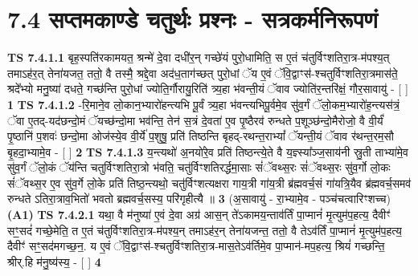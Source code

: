 \documentclass[17pt]{extarticle}
\begin{document}
     \section*{ 7.4      सप्तमकाण्डे चतुर्थः प्रश्नः - सत्रकर्मनिरूपणं }
                                        \textbf{ TS 7.4.1.1} \newline
                  बृह॒स्पति॑रकामयत॒ श्रन्मे॑ दे॒वा दधी॑र॒न् गच्छे॑यं पुरो॒धामिति॒ स ए॒तं च॑तुर्विꣳशतिरा॒त्र-म॑पश्य॒त् तमाऽह॑र॒त् तेना॑यजत॒ ततो॒ वै तस्मै॒ श्रद्दे॒वा अद॑ध॒ताग॑च्छत् पुरो॒धां ॅय ए॒वं ॅवि॒द्वाꣳस॑-श्चतुर्विꣳशतिरा॒त्रमास॑ते॒ श्रदे᳚भ्यो मनु॒ष्या॑ दधते॒ गच्छ॑न्ति पुरो॒धां ज्योति॒र्गौरायु॒रिति॑ त्र्य॒हा भ॑वन्ती॒यं ॅवाव ज्योति॑र॒न्तरि॑क्षं॒ गौर॒सावायु॑ - [  ] \textbf{  1} \newline
                  \newline
                                \textbf{ TS 7.4.1.2} \newline
                  -रि॒माने॒व लो॒कान॒भ्यारो॑हन्त्यभि पू॒र्वं त्र्य॒हा भ॑वन्त्यभिपू॒र्वमे॒व सु॑व॒र्गं ॅलो॒कम॒भ्यारो॑ह॒न्त्यस॑त्रं॒ ॅवा ए॒तद्-यद॑छन्दो॒मं ॅयच्छ॑न्दो॒मा भव॑न्ति॒ तेन॑ स॒त्रं दे॒वता॑ ए॒व पृ॒ष्ठैरव॑ रुन्धते प॒शूञ्छ॑न्दो॒मैरोजो॒ वै वी॒र्यं॑ पृ॒ष्ठानि॑ प॒शवः॑ छन्दो॒मा ओज॑स्ये॒व वी॒र्ये॑ प॒शुषु॒ प्रति॑ तिष्ठन्ति बृहद्-रथन्त॒राभ्यां᳚ ॅयन्ती॒यं ॅवाव र॑थन्त॒रम॒सौ बृ॒हदा॒भ्यामे॒व - [  ] \textbf{  2} \newline
                  \newline
                                \textbf{ TS 7.4.1.3} \newline
                  य॒न्त्यथो॑ अ॒नयो॑रे॒व प्रति॑ तिष्ठन्त्ये॒ते वै य॒ज्ञ्स्या᳚ञ्ज॒साय॑नी स्रु॒ती ताभ्या॑मे॒व सु॑व॒र्गं ॅलो॒कं ॅय॑न्ति चतुर्विꣳशतिरा॒त्रो भ॑वति॒ चतु॑र्विꣳशतिरर्द्धमा॒साः सं॑ॅवथ्स॒रः सं॑ॅवथ्स॒रः सु॑व॒र्गो लो॒कः सं॑ॅवथ्स॒र ए॒व सु॑व॒र्गे लो॒के प्रति॑ तिष्ठ॒न्त्यथो॒ चतु॑र्विꣳशत्यक्षरा गाय॒त्री गा॑य॒त्री ब्र॑ह्मवर्च॒सं गा॑यत्रि॒यैव ब्र॑ह्मवर्च॒समव॑ रुन्धते ऽतिरा॒त्राव॒भितो॑ भवतो ब्रह्मवर्च॒सस्य॒ परि॑गृहीत्यै ॥ \textbf{  3} \newline
                  \newline
                      (अ॒सावायु॑ - रा॒भ्यामे॒व - पञ्च॑चत्वारिꣳशच्च)  \textbf{(A1)} \newline \newline
                                        \textbf{ TS 7.4.2.1} \newline
                  यथा॒ वै म॑नुष्या॑ ए॒वं दे॒वा अग्र॑ आस॒न् ते॑ऽकामय॒न्ताव॑र्तिं पा॒प्मानं॑ मृ॒त्युम॑प॒हत्य॒ दैवीꣳ॑ सꣳ॒॒सदं॑ गच्छे॒मेति॒ त ए॒तं च॑तुर्विꣳशतिरा॒त्र-म॑पश्य॒न् तमाऽह॑र॒न् तेना॑यजन्त॒ ततो॒ वै तेऽव॑र्तिं पा॒प्मानं॑ मृ॒त्युम॑प॒हत्य॒ दैवीꣳ॑ सꣳ॒॒सद॑मगच्छ॒न॒. य ए॒वं ॅवि॒द्वाꣳस॑-श्चतुर्विꣳशतिरा॒त्र-मास॒तेऽव॑र्तिमे॒व पा॒प्मान॑-मप॒हत्य॒ श्रियं॑ गच्छन्ति॒ श्रीर्.हि म॑नु॒ष्य॑स्य॒ - [  ] \textbf{  4} \newline
\end{document}
